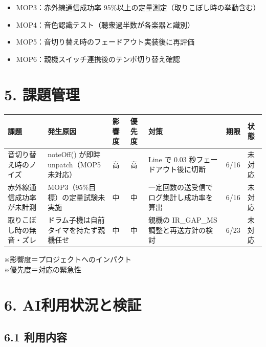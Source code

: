 \documentclass[a4paper,11pt]{ltjsarticle}
\providecommand{\％}{\%}
\begin{document}
\begin{itemize}
    \item MOP3：赤外線通信成功率 95\％以上の定量測定（取りこぼし時の挙動含む）
    \item MOP4：音色認識テスト（聴衆過半数が各楽器と識別）
    \item MOP5：音切り替え時のフェードアウト実装後に再評価
    \item MOP6：親機スイッチ連携後のテンポ切り替え確認
\end{itemize}

\section{5. 課題管理}

\begin{longtable}{|p{2.6cm}|p{2.8cm}|p{1cm}|p{1cm}|p{3.0cm}|p{1.6cm}|p{1.6cm}|}
\hline
\rowcolor[gray]{0.9}
課題 & 発生原因 & 影響度 & 優先度 & 対策 & 期限 & 状態 \\
\hline
音切り替え時のノイズ & noteOff() が即時 unpatch（MOP5 未対応） & 高 & 高 & Line で 0.03 秒フェードアウト後に切断 & 6/16 & 未対応 \\
\hline
赤外線通信成功率が未計測 & MOP3（95\％目標）の定量試験未実施 & 中 & 中 & 一定回数の送受信でログ集計し成功率を算出 & 6/16 & 未対応 \\
\hline
取りこぼし時の無音・ズレ & ドラム子機は自前タイマを持たず親機任せ & 中 & 中 & 親機の IR\_GAP\_MS 調整と再送方針の検討 & 6/23 & 未対応 \\
\hline
\end{longtable}

\vspace{0.5em}
※影響度＝プロジェクトへのインパクト\\
※優先度＝対応の緊急性

\section{6. AI利用状況と検証}

\subsection*{6.1 利用内容}
\end{document}
